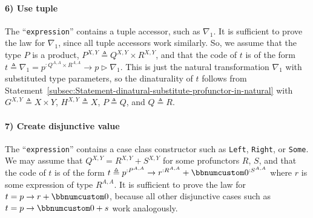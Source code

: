 \paragraph{6) Use tuple }

The ``\lstinline!expression!'' contains a tuple accessor, such
as $\nabla_{1}$. It is sufficient to prove the law for $\nabla_{1}$,
since all tuple accessors work similarly. So, we assume that the type
$P$ is a product, $P^{X,Y}\triangleq Q^{X,Y}\times R^{X,Y}$, and
that the code of $t$ is of the form $t\triangleq\nabla_{1}=p^{:Q^{A,A}\times R^{A,A}}\rightarrow p\triangleright\nabla_{1}$.
This is just the natural transformation $\nabla_{1}$ with substituted
type parameters, so the dinaturality of $t$ follows from Statement~\ref{subsec:Statement-dinatural-substitute-profunctor-in-natural}
with $G^{X,Y}\triangleq X\times Y$, $H^{X,Y}\triangleq X$, $P\triangleq Q$,
and $Q\triangleq R$.

\paragraph{7) Create disjunctive value }

The ``\lstinline!expression!'' contains a case class constructor
such as \lstinline!Left!, \lstinline!Right!, or \lstinline!Some!.
We may assume that $Q^{X,Y}=R^{X,Y}+S^{X,Y}$ for some profunctors
$R$, $S$, and that the code of $t$ is of the form $t\triangleq p^{:P^{A,A}}\rightarrow r^{:R^{A,A}}+\bbnum 0^{:S^{A,A}}$
where $r$ is some expression of type $R^{A,A}$. It is sufficient
to prove the law for $t=p\rightarrow r+\bbnum 0$, because all other
disjunctive cases such as $t=p\rightarrow\bbnum 0+s$ work analogously.

